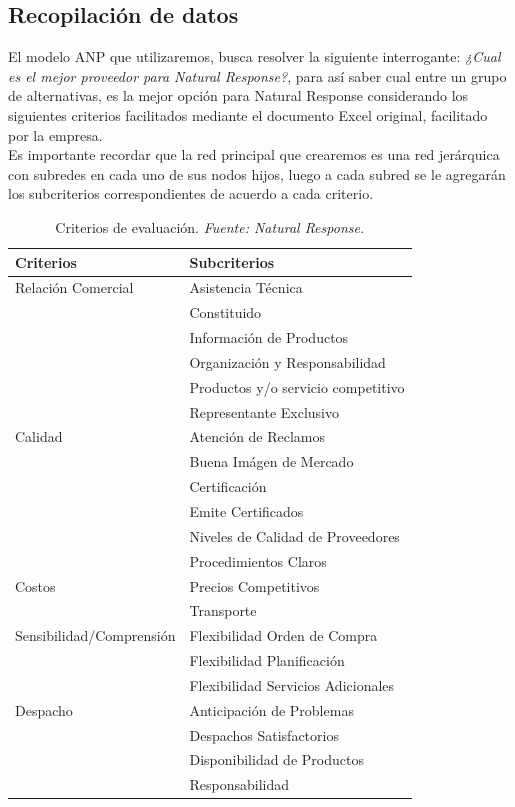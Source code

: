 \documentclass[12pt,twocolumn]{article}
\begin{document}
\subsection{Recopilación de datos}
El modelo ANP que utilizaremos, busca resolver la siguiente interrogante: \textit{¿Cual es el mejor proveedor para Natural Response?}, para así saber cual entre un grupo de alternativas, es la mejor opción para Natural Response considerando los siguientes criterios facilitados mediante el documento Excel original, facilitado por la empresa.\\
Es importante recordar que la red principal que crearemos es una red jerárquica con subredes en cada uno de sus nodos hijos, luego a cada subred se le agregarán los subcriterios correspondientes de acuerdo a cada criterio.

\begin{table}[h]
\centering
\begin{tabular}{|l|l|}
\hline
Criterios & Subcriterios \\
\hline
\multirow{1}{*}{Relación Comercial}
 & Asistencia Técnica \\
 & Constituido \\
 & Información de Productos \\
 & Organización y Responsabilidad \\
 & Productos y/o servicio competitivo \\
 & Representante Exclusivo\\
\hline
\multirow{1}{*}{Calidad}
 & Atención de Reclamos \\
 & Buena Imágen de Mercado \\
 & Certificación \\
 & Emite Certificados \\
 & Niveles de Calidad de Proveedores \\
 & Procedimientos Claros\\
\hline
\multirow{1}{*}{Costos}
 & Precios Competitivos \\
 & Transporte \\
\hline
\multirow{1}{*}{Sensibilidad/Comprensión}
 & Flexibilidad Orden de Compra \\
 & Flexibilidad Planificación \\
 & Flexibilidad Servicios Adicionales \\ 
\hline
\multirow{1}{*}{Despacho}
 & Anticipación de Problemas \\
 & Despachos Satisfactorios \\
 & Disponibilidad de Productos \\ 
 & Responsabilidad \\
\hline
\end{tabular}
\caption{Criterios de evaluación. \textit{Fuente: Natural Response.}}
\label{tab:criterios}
\end{table}
\newpage
\end{document}
